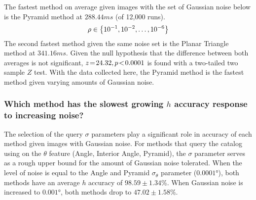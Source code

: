 \documentclass[conference]{IEEEtran}
\begin{document}
    The fastest method on average given images with the set of Gaussian noise below is the Pyramid method at
    $288.44\si{ms}$ (of 12,000 runs).
    \begin{equation}\label{eq:sigmasTested}
    \rho \in \set{10^{-1}, 10^{-2}, \ldots, 10^{-6}}
    \end{equation}
    The second fastest method given the same noise set is the Planar Triangle method at $341.16\si{ms}$.
    Given the null hypothesis that the difference between both averages is not significant, $z \!=\! 24.32, p\!<\!0.0001$ is
    found with a two-tailed two sample $Z$ test.
    With the data collected here, the Pyramid method is the fastest method given varying amounts of Gaussian noise.

    \subsubsection{Which method has the slowest growing $h$ accuracy response to increasing noise?}
    The selection of the query $\sigma$ parameters play a significant role in accuracy of each method given images with
    Gaussian noise.
    For methods that query the catalog using on the $\theta$ feature (Angle, Interior Angle, Pyramid), the $\sigma$
    parameter serves as a rough upper bound for the amount of Gaussian noise tolerated.
    When the level of noise is equal to the Angle and Pyramid $\sigma_\theta$ parameter ($\ang{0.0001}$),
    both methods have an average $h$ accuracy of $98.59\!\pm\!1.34\%$.
    When Gaussian noise is increased to $\ang{0.001}$, both methods drop to $47.02\!\pm\!1.58\%$.
\end{document}
